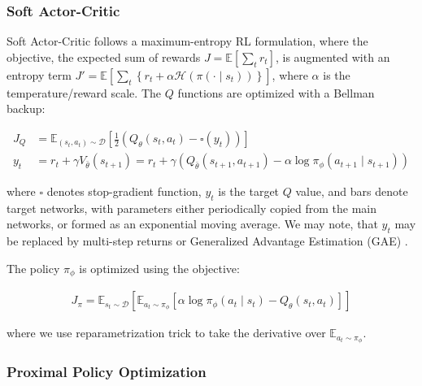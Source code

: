 \documentclass[en]{pracamgr}
\begin{document}
\subsubsection{Soft Actor-Critic}

\begin{sloppypar}
  Soft Actor-Critic follows a maximum-entropy RL formulation, where the objective, the expected sum of rewards $J = \mathbb{E}\left[\sum_t r_t\right]$, is augmented with an entropy term $J' = \mathbb{E}\left[\sum_t \left\{r_t + \alpha \mathcal{H}(\pi(\cdot \mid s_t))\right\}\right]$, where $\alpha$ is the temperature/reward scale. The $Q$ functions are optimized with a Bellman backup:
\end{sloppypar}

\begin{equation}
  \label{eq:sac_q_loss}
  \begin{aligned}
    J_Q & = \mathbb{E}_{(s_t, a_t) \sim \mathcal{D}} \left[\frac{1}{2}\left(Q_\theta(s_t, a_t) - \square( y_t)\right)\right]                       \\
    y_t & = r_t + \gamma V_{\bar{\theta}}(s_{t+1}) = r_t + \gamma(Q_{\bar{\theta}}(s_{t+1}, a_{t+1}) - \alpha \log \pi_\phi(a_{t+1} \mid s_{t+1}))
  \end{aligned}
\end{equation}

where $\square$ denotes stop-gradient function, $y_t$ is the target $Q$ value, and bars denote target networks, with parameters either periodically copied from the main networks, or formed as an exponential moving average. We may note, that $y_t$ may be replaced by multi-step returns or Generalized Advantage Estimation (GAE) \autocite{schulmanHighDimensionalContinuousControl2018}.

The policy $\pi_\phi$ is optimized using the objective:

\begin{align*}
  J_\pi = \mathbb{E}_{s_t \sim \mathcal{D}} \left[\mathbb{E}_{a_t \sim \pi_\phi} \left[\alpha \log \pi_\phi(a_t \mid s_t) - Q_\theta(s_t, a_t) \right] \right]
\end{align*}

where we use reparametrization trick \autocite{kingmaAutoEncodingVariationalBayes2022} to take the derivative over $\mathbb{E}_{a_t \sim \pi_\phi}$.

\subsubsection{Proximal Policy Optimization}
\end{document}
